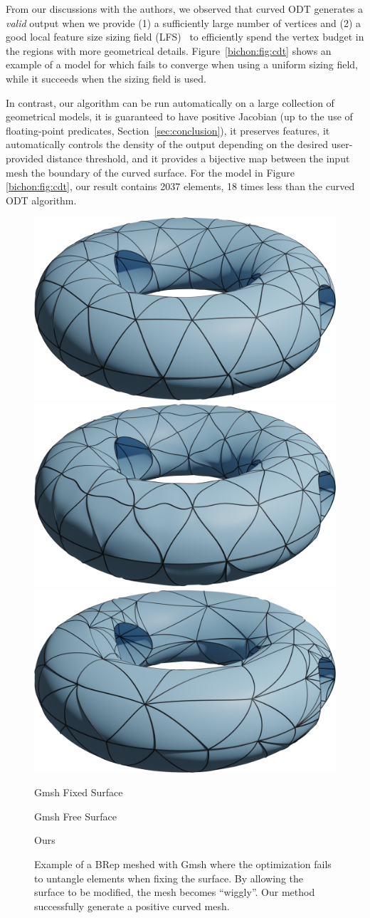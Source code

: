 From our discussions with the authors, we observed that curved ODT generates a \emph{valid} output when we provide (1) a sufficiently large number of vertices and (2) a good local feature size sizing field (LFS)~\cite{alliez2005variational} to efficiently spend the vertex budget in the regions with more geometrical details.  Figure~\ref{bichon:fig:cdt} shows an example of a model for which \cite{feng2018curved} fails to converge when using a uniform sizing field, while it succeeds when the sizing field is used.

In contrast, our algorithm can be run automatically on {a} large collection of geometrical models, it is guaranteed to have positive Jacobian (up to the use of floating-point predicates, Section~\ref{sec:conclusion}), it preserves features, it automatically controls the density of the output depending on the desired user-provided distance threshold, and it provides a bijective map between the input mesh the boundary of the curved surface. For the model in Figure \ref{bichon:fig:cdt}, our result contains 2037 elements, 18 times less than the curved ODT algorithm. %


\begin{figure}
    \centering\small
    \includegraphics[width=0.32\linewidth]{curve_meshing_in_shell_tex/figs/gmsh/not-bij}\hfill
    \includegraphics[width=0.32\linewidth]{curve_meshing_in_shell_tex/figs/gmsh/bij}\hfill
    \includegraphics[width=0.32\linewidth]{curve_meshing_in_shell_tex/figs/gmsh/torus}
     \parbox{.32\linewidth}{\centering Gmsh Fixed Surface}\hfill
    \parbox{.32\linewidth}{\centering Gmsh Free Surface}\hfill
    \parbox{.32\linewidth}{\centering Ours}\par
    \caption{Example of a BRep meshed with Gmsh where the optimization fails to untangle elements when fixing the surface. By allowing the surface to be modified, the mesh becomes ``wiggly''. Our method successfully generate a positive curved mesh.}
    \label{bichon:fig:gmsh-flipped}
\end{figure}


